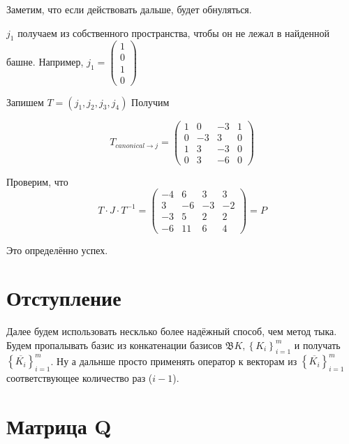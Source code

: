 \documentclass[12pt, a4paper]{article}
\begin{document}
    Заметим, что если действовать дальше, будет обнуляться.

    $j_1$ получаем из собственного пространства, чтобы он не лежал в найденной башне. Например, $j_1 = \begin{pmatrix}1\\0\\1\\0\end{pmatrix}$

    Запишем $T = (j_1, j_2, j_3, j_4)$ Получим

    \begin{equation}
        T_{canonical \to j} = \left(\begin{matrix}
            1 & 0 & -3 & 1 \\
            0 & -3 & 3 & 0 \\
            1 & 3 & -3 & 0 \\
            0 & 3 & -6 & 0
        \end{matrix}\right)
    \end{equation}

    Проверим, что 
    \begin{equation}
        T \cdot J \cdot T^{-1} = \left(\begin{matrix}
            -4 & 6 & 3 & 3 \\
            3 & -6 & -3 & -2 \\
            -3 & 5 & 2 & 2 \\
            -6 & 11 & 6 & 4
        \end{matrix}\right) = P
    \end{equation}

    Это определённо успех.

    \section{Отступление}

    Далее будем использовать несклько более надёжный способ, чем метод тыка.
    Будем пропалывать базис из конкатенации базисов $\mathfrak{B}K, \left\{ K_i \right\}_{i = 1}^m$ и получать $\left\{ \overline{K_i} \right\}_{i = 1}^m$.
    Ну а дальнше просто применять оператор к векторам из $\left\{ \overline{K_i} \right\}_{i = 1}^m$ соответствующее количество раз ($i - 1$).


    \section{Матрица Q}
    
\end{document}
